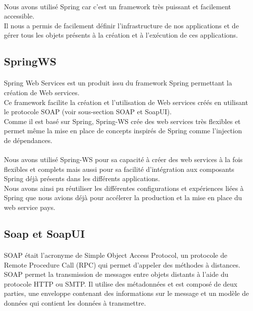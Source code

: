 \paragraph{}
Nous avons utilisé Spring car c'est un framework très puissant et facilement accessible.\\
Il nous a permis de facilement définir l'infrastructure de nos applications et de gérer tous les objets présents à la création et à l'exécution de ces applications.\\

\subsection{SpringWS}
\paragraph{} Spring Web Services est un produit issu du framework Spring permettant la création de Web services.\\
Ce framework facilite la création et l'utilisation de Web services créés en utilisant le protocole SOAP (voir sous-section SOAP et SoapUI).\\
Comme il est basé sur Spring, Spring-WS crée des web services très flexibles et permet même la mise en place de concepts inspirés de Spring comme l'injection de dépendances.\\
\paragraph{}
Nous avons utilisé Spring-WS pour sa capacité à créer des web services à la fois flexibles et complets mais aussi pour sa facilité d'intégration aux composants Spring déjà présents dans les différents applications.\\
Nous avons ainsi pu réutiliser les différentes configurations et expériences liées à Spring que nous avions déjà pour accélerer la production et la mise en place du web service pays.\\

\subsection{Soap et SoapUI}
\paragraph{} SOAP était l'acronyme de Simple Object Access Protocol, un protocole de Remote Procedure Call (RPC) qui permet d'appeler des méthodes à distances.\\
SOAP permet la transmission de messages entre objets distants à l'aide du protocole HTTP ou SMTP.
Il utilise des métadonnées et est composé de deux parties, une enveloppe contenant des informations sur le message et un modèle de données qui contient les données à transmettre.\\

